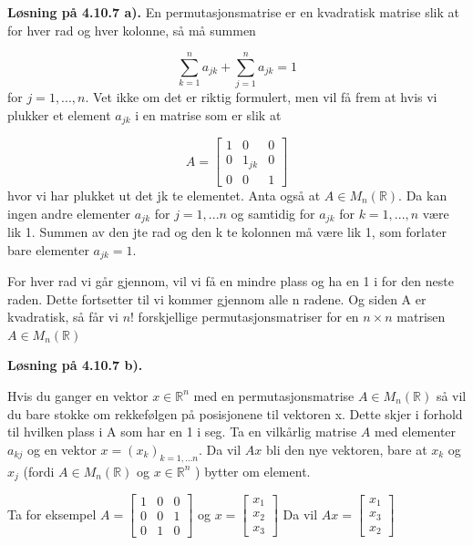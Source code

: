 \documentclass[a4paper,norsk]{article}
\newenvironment{oppgave}[1]%
	{\trivlist{}\item\relax\textbf{Løsning på #1.}\medspace}%
	{\endtrivlist}
\begin{document}
\begin{oppgave}{4.10.7 a)}
En permutasjonsmatrise er en kvadratisk matrise slik at for hver rad og hver kolonne, så må summen

\[
    \sum_{ k=1 }^{ n } a_{jk} + \sum_{ j=1 }^{ n } a_{jk} = 1
\]
for $ j=1, ..., n $. Vet ikke om det er riktig formulert, men vil få frem at hvis vi plukker et element $ a_{jk} $ i en matrise som er slik at

\[
    A = \begin{bmatrix}
        1&0&0\\
        0&1_{jk}&0\\
        0&0&1
    \end{bmatrix} 
\]
hvor vi har plukket ut det jk te elementet. Anta også at $ A \in M_n(\mathbb{R}) $. Da kan ingen andre elementer $ a_{jk} $ for $ j=1,...n $ og samtidig for $ a_{jk} $ for $ k=1, ..., n $ være lik 1. Summen av den jte rad og den k te kolonnen må være lik 1, som forlater bare elementer $ a_{jk}=1 $.

For hver rad vi går gjennom, vil vi få en mindre plass og ha en 1 i for den neste raden. Dette fortsetter til vi kommer gjennom alle n radene. Og siden A er kvadratisk, så får vi $ n! $ forskjellige permutasjonsmatriser for en $ n \times  n$  matrisen $ A \in M_n(\mathbb{R}) $  

    
\end{oppgave}


\begin{oppgave}{4.10.7 b)}

Hvis du ganger en vektor $ x \in \mathbb{R}^n $ med en permutasjonsmatrise $ A \in M_n(\mathbb{R}) $ så vil du bare stokke om rekkefølgen på posisjonene til vektoren x. Dette skjer i forhold til hvilken plass i A som har en 1 i seg. Ta en vilkårlig matrise $ A $ med elementer $ a_{kj} $ og en vektor $ x = (x_k)_{k=1,...n} $. Da vil $ Ax $ bli den nye vektoren, bare at $ x_k $ og $ x_j $ (fordi $ A\in M_n(\mathbb{R}) $ og $ x \in \mathbb{R}^n $  ) bytter om element.

Ta for eksempel $ A = \begin{bmatrix}
    1&0&0\\
    0&0&1\\
    0&1&0
\end{bmatrix}  $ og $ x = \begin{bmatrix}
    x_1\\
    x_2\\
    x_3
\end{bmatrix}  $ 
Da vil $ Ax = \begin{bmatrix}
    x_1\\
    x_3\\
    x_2
\end{bmatrix}  $ 
    
\end{oppgave}
\end{document}
